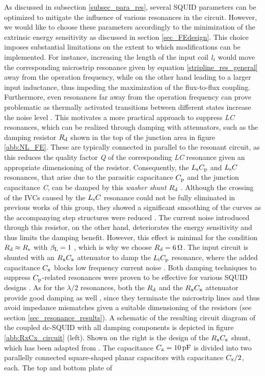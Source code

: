 As discussed in subsection \ref{subsec_para_res}, several SQUID parameters can be optimized to mitigate the influence of various resonances in the circuit. However, we would like to choose these parameters accordingly to the minimization of the extrinsic energy sensitivity as discussed in section \ref{sec_FEdesign}. This choice imposes substantial limitations on the extent to which modifications can be implemented. For instance, increasing the length of the input coil $l_{\rm i}$ would move the corresponding microstrip resonance given by equation \ref{stripline_res_general} away from the operation frequency, while on the other hand leading to a larger input inductance, thus impeding the maximization of the flux-to-flux coupling. Furthermore, even resonances far away from the operation frequency can prove problematic as thermally activated transitions between different states increase the noise level \cite{Sepp1987}. This motivates a more practical approach to suppress \textit{LC} resonances, which can be realized through damping with attenuators, such as the damping resistor $R_{\rm d}$ shown in the top of the junction area in figure \ref{abb:NL_FE}. These are typically connected in parallel to the resonant circuit, as this reduces the quality factor \textit{Q} of the corresponding \textit{LC} resonance given an appropriate dimensioning of the resistor. Consequently, the $L_{\rm s}C_{\rm p}$ and $L_{\rm s}C$ resonances, that arise due to the parasitic capacitance $C_{\rm p}$ and the junction capacitance \textit{C}, can be damped by this \textit{washer shunt} $R_{\rm d}$ \cite{Ono1997, Ryh1992}. Although the crossing of the IVCs caused by the $L_{\rm s}C$ resonance could not be fully eliminated in previous works of this group, they showed a significant smoothing of the curves as the accompanying step structures were reduced \cite{Bauer2018}. The current noise introduced through this resistor, on the other hand, deteriorates the energy sensitivity and thus limits the damping benefit. However, this effect is minimal for the condition $R_{\rm d}\approx R_{\rm s}$ with $\beta_{\rm L}=1$ \cite{Enpuku1986, Ryh1992}, which is why we choose $R_{\rm d}=\qty{6}{\ohm}$. The input circuit is shunted with an $R_{\rm x}C_{\rm x}$ attenuator to damp the $L_{\rm i}C_{\rm p}$ resonance, where the added capacitance $C_{\rm x}$ blocks low frequency current noise \cite{Sepp1987}. Both damping techniques to suppress $C_{\rm p}$-related resonances were proven to be effective for various SQUID designs \cite{Knuutila1987, Enpuku1986,Can1991,Bauer2018}. As for the $\lambda/2$ resonances, both the $R_{\rm d}$ and the $R_{\rm x}C_{\rm x}$ attenuator provide good damping as well \cite{Can1991}, since they terminate the microstrip lines and thus avoid impedance mismatches given a suitable dimensioning of the resistors (see section \ref{sec_resonance_results}). A schematic of the resulting circuit diagram of the coupled dc-SQUID with all damping components is depicted in figure \ref{abb:RxCx_circuit} (left). Shown on the right is the design of the $R_{\rm x}C_{\rm x}$ shunt, which has been adapted from \cite{Bauer2022}. The capacitance $C_{\rm x}=\qty{10}{\pico\farad}$ is divided into two parallelly connected square-shaped planar capacitors with capacitance $C_{\rm x}/2$, each. The top and bottom plate of 